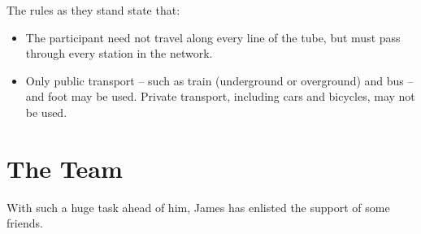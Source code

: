 \documentclass[a4paper,11pt]{article}  %
\begin{document}
The rules as they stand state that:
\begin{itemize}
\item The participant need not travel along every line of the tube,
  but must pass through every station in the network.
  \item Only public transport -- such as train (underground or
    overground) and bus -- and foot may be used. Private transport,
    including cars and bicycles, may not be used.
\end{itemize}

\section*{The Team} 

With such a huge task ahead of him, James has enlisted the support of
some friends. 

\bigskip
\end{document}

